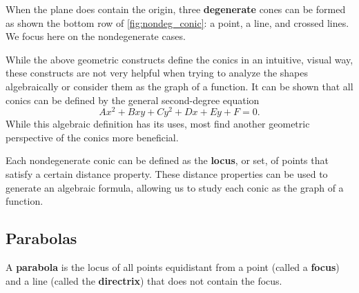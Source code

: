 When the plane does contain the origin, three \textbf{degenerate} cones can be formed as shown the bottom row of \autoref{fig:nondeg_conic}: a point, a line, and crossed lines. We focus here on the nondegenerate cases.

While the above geometric constructs define the conics in an intuitive, visual way, these constructs are not very helpful when trying to analyze the shapes algebraically or consider them as the graph of a function. It can be shown that all conics can be defined by the general second-degree equation
\[Ax^2+B xy+Cy^2+Dx+Ey+F=0.\]
While this algebraic definition has its uses, most find another geometric perspective of the conics more beneficial.

Each nondegenerate conic can be defined as the \textbf{locus}, or set, of points that satisfy a certain distance property. These distance properties can be used to generate an algebraic formula, allowing us to study each conic as the graph of a function.

\subsection{Parabolas}

\begin{definition}[Parabola]\label{def:parabola}%
A \textbf{parabola} is the locus of all points equidistant from a point (called a \textbf{focus}) and a line (called the \textbf{directrix}) that does not contain the focus.
\end{definition}


